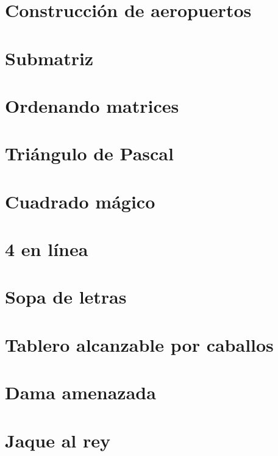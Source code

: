 \section{Construcción de aeropuertos}


\section{Submatriz}


\section{Ordenando matrices}


\section{Triángulo de Pascal}





\section{Cuadrado mágico}


\section{4 en línea}


\section{Sopa de letras}


\section{Tablero alcanzable por caballos}


\section{Dama amenazada}


\section{Jaque al rey}


